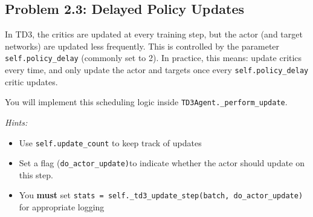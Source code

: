 \documentclass[12pt]{article}
\begin{document}

\subsection*{Problem 2.3: Delayed Policy Updates}

In TD3, the critics are updated at every training step, but the actor (and target networks) are updated less frequently. This is controlled by the parameter \texttt{self.policy\_delay} (commonly set to 2). In practice, this means: update critics every time, and only update the actor and targets once every \texttt{self.policy\_delay} critic updates.

You will implement this scheduling logic inside \texttt{TD3Agent.\_perform\_update}. 

\textit{Hints:}
\begin{itemize}
    \item Use \texttt{self.update_count} to keep track of updates
    \item Set a flag (\texttt{do\_actor\_update)}to indicate whether the actor should update on this step.
    \item You \textbf{must} set \texttt{stats = self.\_td3\_update\_step(batch, do\_actor\_update)} for appropriate logging
\end{itemize}


\end{document}
